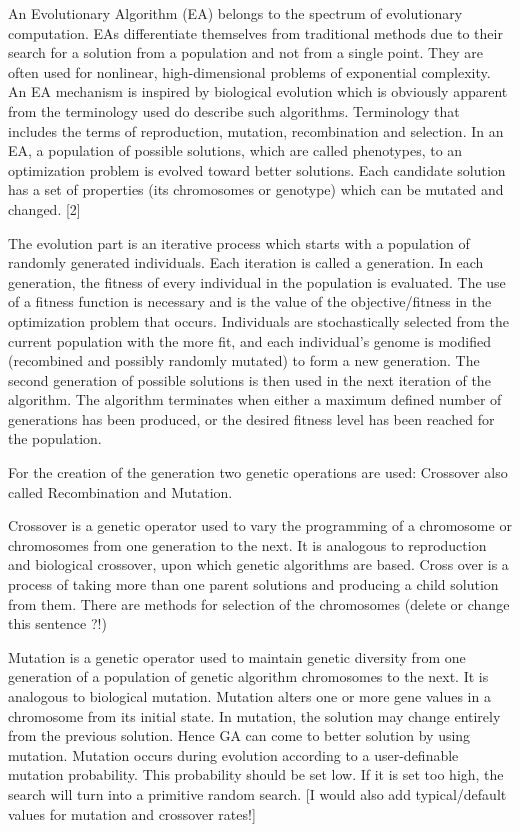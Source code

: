 \documentclass[11pt,onecolumn,a4paper]{report}
\begin{document}
An Evolutionary Algorithm (EA) belongs to the spectrum of evolutionary computation. EAs differentiate themselves from traditional methods due to their search for a solution from a population and not from a single point. They are often used for nonlinear, high-dimensional problems of exponential complexity. An EA mechanism is inspired by biological evolution which is obviously apparent from the terminology used do describe such algorithms. Terminology that includes the terms of reproduction, mutation, recombination and selection. 
In an EA, a population of possible solutions, which are called phenotypes, to an optimization problem is evolved toward better solutions. Each candidate solution has a set of properties (its chromosomes or genotype) which can be mutated and changed. [2]

The evolution part is an iterative process which starts with a population of randomly generated individuals. Each iteration is called a generation. In each generation, the fitness of every individual in the population is evaluated. The use of a fitness function is necessary and is the value of the objective/fitness in the optimization problem that occurs. Individuals are stochastically selected from the current population with the more fit, and each individual's genome is modified (recombined and possibly randomly mutated) to form a new generation. The second generation of possible solutions is then used in the next iteration of the algorithm. The algorithm terminates when either a maximum defined number of generations has been produced, or the desired fitness level has been reached for the population.

For the creation of the generation two genetic operations are used: Crossover also called Recombination and Mutation.

Crossover is a genetic operator used to vary the programming of a chromosome or chromosomes from one generation to the next. It is analogous to reproduction and biological crossover, upon which genetic algorithms are based. Cross over is a process of taking more than one parent solutions and producing a child solution from them. There are methods for selection of the chromosomes (delete or change this sentence ?!)

Mutation is a genetic operator used to maintain genetic diversity from one generation of a population of genetic algorithm chromosomes to the next. It is analogous to biological mutation. Mutation alters one or more gene values in a chromosome from its initial state. In mutation, the solution may change entirely from the previous solution. Hence GA can come to better solution by using mutation. Mutation occurs during evolution according to a user-definable mutation probability. This probability should be set low. If it is set too high, the search will turn into a primitive random search. [I would also add typical/default values for mutation and crossover rates!]\\
\end{document}
